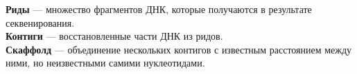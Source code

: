 \documentclass[14pt]{matmex-diploma-custom}
\begin{document}




\textbf{Риды} --- множество фрагментов ДНК, которые получаются в результате секвенирования.\\

\textbf{Контиги} --- восстановленные части ДНК из ридов.\\

\textbf{Скаффолд} --- объединение нескольких контигов с известным расстоянием между ними, но неизвестными самими нуклеотидами.\\


\setmonofont[Mapping=tex-text]{CMU Typewriter Text}


\end{document}
